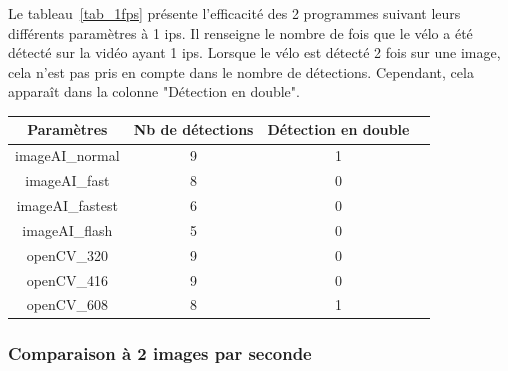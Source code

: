 Le tableau~\ref{tab_1fps} présente l'efficacité des 2 programmes suivant leurs différents paramètres à 1 ips.
Il renseigne le nombre de fois que le vélo a été détecté sur la vidéo ayant 1 ips.
Lorsque le vélo est détecté 2 fois sur une image, cela n'est pas pris en compte dans le nombre de détections.
Cependant, cela apparaît dans la colonne "Détection en double".


\begin{center}
    \begin{tabular}{|c|c|c|c|}
        \hline
        \rowcolor{tableColorDark} Paramètres & Nb de détections & Détection en double \\
        \hline 

        imageAI\_normal                      &        9         &         1           \\\hline
        imageAI\_fast                        &        8         &         0           \\\hline
        imageAI\_fastest                     &        6         &         0           \\\hline
        imageAI\_flash                       &        5         &         0           \\\hline
        openCV\_320                          &        9         &         0           \\\hline
        openCV\_416                          &        9         &         0           \\\hline
        openCV\_608                          &        8         &         1           \\\hline
    \end{tabular}
    \label{tab_1fps}
\end{center}


\subsubsection{Comparaison à 2 images par seconde}
\label{sec:comparaisonIA:resultats:2fps}

